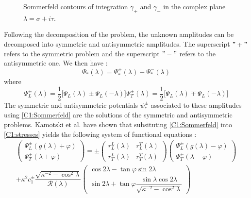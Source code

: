 \begin{figure}[h]
\caption{Sommerfeld contours of integration $\gamma_+$ and $\gamma_-$ in the complex plane $\lambda=\sigma+i\tau$.}
\label{C1:Somcontours}
\end{figure}

Following the decomposition of the problem, the unknown amplitudes can be decomposed into symmetric and antisymmetric amplitudes. The superscript $"+"$ refers to the symmetric problem and the superscript $"-"$ refers to the antisymmetric one. We then have :
\begin{equation}
\Psi_*(\lambda)=\Psi_*^+(\lambda)+\Psi_*^-(\lambda)
\end{equation}
where
\begin{subequations}
\begin{equation}
\Psi_L^\pm(\lambda)=\frac{1}{2}\lbrack\Psi_L(\lambda)\pm\Psi_L(-\lambda)\rbrack
\end{equation}
\begin{equation}
\Psi_T^\pm(\lambda)=\frac{1}{2}\lbrack\Psi_L(\lambda)\mp\Psi_L(-\lambda)\rbrack
\end{equation}
\end{subequations}
The symmetric and antisymmetric potentials $\psi_*^\pm$ associated to these amplitudes using \eqref{C1:Sommerfeld} are the solutions of the symmetric and antisymmetric problems. Kamotski et al. \cite{KamotskiFradkin} have shown that subsituting \eqref{C1:Sommerfeld} into \eqref{C1:stresses} yields the following system of functional equations :
\begin{multline}
\begin{pmatrix}
\Psi_L^\pm(g(\lambda)+\varphi)\\
\Psi_T^\pm(\lambda+\varphi)
\end{pmatrix}
=\pm\begin{pmatrix}
r_L^L(\lambda)&r_L^T(\lambda)\\
r_T^L(\lambda)&r_T^T(\lambda)
\end{pmatrix} 
\begin{pmatrix}
\Psi_L^\pm(g(\lambda)-\varphi)\\
\Psi_T^\pm(\lambda-\varphi)
\end{pmatrix} \\
+\kappa^2 c_1^\pm\dfrac{\sqrt{\kappa^{-2}-\cos^2\lambda}}{\mathcal{R}(\lambda)} \begin{pmatrix}
\cos 2\lambda-\tan\varphi\sin 2\lambda \\
\sin 2\lambda+\tan\varphi\dfrac{\sin\lambda\cos 2\lambda}{\sqrt{\kappa^{-2}-\cos^2\lambda}}
\end{pmatrix}
\label{C1:SIfunctional}
\end{multline}
